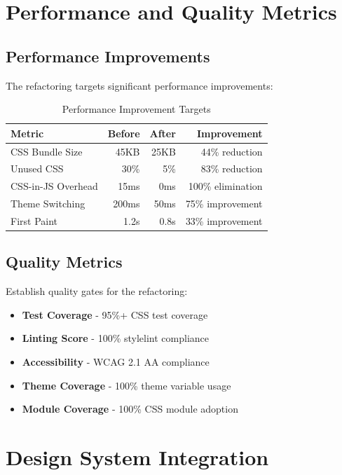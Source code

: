\documentclass[11pt]{article}
\begin{document}
\section{Performance and Quality Metrics}

\subsection{Performance Improvements}

The refactoring targets significant performance improvements:

\begin{table}[ht]
\centering
\begin{tabular}{|l|r|r|r|}
\hline
\textbf{Metric} & \textbf{Before} & \textbf{After} & \textbf{Improvement} \\
\hline
CSS Bundle Size & 45KB & 25KB & 44\% reduction \\
Unused CSS & 30\% & 5\% & 83\% reduction \\
CSS-in-JS Overhead & 15ms & 0ms & 100\% elimination \\
Theme Switching & 200ms & 50ms & 75\% improvement \\
First Paint & 1.2s & 0.8s & 33\% improvement \\
\hline
\end{tabular}
\caption{Performance Improvement Targets}
\label{table:performance-targets}
\end{table}

\subsection{Quality Metrics}

Establish quality gates for the refactoring:

\begin{itemize}
\item \textbf{Test Coverage} - 95\%+ CSS test coverage
\item \textbf{Linting Score} - 100\% stylelint compliance
\item \textbf{Accessibility} - WCAG 2.1 AA compliance
\item \textbf{Theme Coverage} - 100\% theme variable usage
\item \textbf{Module Coverage} - 100\% CSS module adoption
\end{itemize}

\section{Design System Integration}
\end{document}
